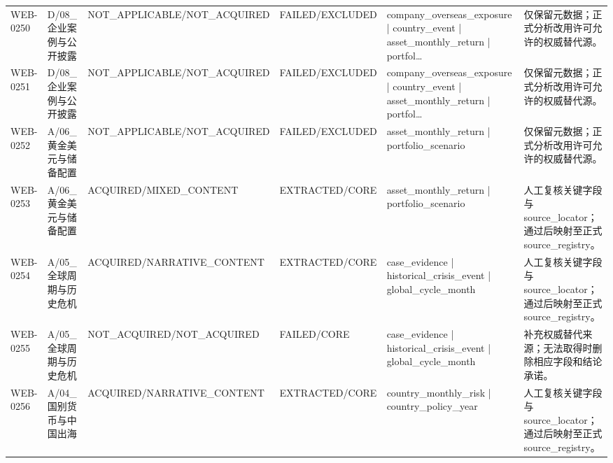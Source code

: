 \begin{landscape}
\begin{longtable}{p{1.8cm}p{2.6cm}p{2.6cm}p{2.6cm}p{4.8cm}p{7.2cm}}
WEB-0250 & D/\allowbreak{}08\_\allowbreak{}企业案例与公开披露 & NOT\_\allowbreak{}APPLICABLE/\allowbreak{}NOT\_\allowbreak{}ACQUIRED & FAILED/\allowbreak{}EXCLUDED & company\_\allowbreak{}overseas\_\allowbreak{}exposure | country\_\allowbreak{}event | asset\_\allowbreak{}monthly\_\allowbreak{}return | portfol… & 仅保留元数据；正式分析改用许可允许的权威替代源。\\
WEB-0251 & D/\allowbreak{}08\_\allowbreak{}企业案例与公开披露 & NOT\_\allowbreak{}APPLICABLE/\allowbreak{}NOT\_\allowbreak{}ACQUIRED & FAILED/\allowbreak{}EXCLUDED & company\_\allowbreak{}overseas\_\allowbreak{}exposure | country\_\allowbreak{}event | asset\_\allowbreak{}monthly\_\allowbreak{}return | portfol… & 仅保留元数据；正式分析改用许可允许的权威替代源。\\
WEB-0252 & A/\allowbreak{}06\_\allowbreak{}黄金美元与储备配置 & NOT\_\allowbreak{}APPLICABLE/\allowbreak{}NOT\_\allowbreak{}ACQUIRED & FAILED/\allowbreak{}EXCLUDED & asset\_\allowbreak{}monthly\_\allowbreak{}return | portfolio\_\allowbreak{}scenario & 仅保留元数据；正式分析改用许可允许的权威替代源。\\
WEB-0253 & A/\allowbreak{}06\_\allowbreak{}黄金美元与储备配置 & ACQUIRED/\allowbreak{}MIXED\_\allowbreak{}CONTENT & EXTRACTED/\allowbreak{}CORE & asset\_\allowbreak{}monthly\_\allowbreak{}return | portfolio\_\allowbreak{}scenario & 人工复核关键字段与source\_\allowbreak{}locator；通过后映射至正式source\_\allowbreak{}registry。\\
WEB-0254 & A/\allowbreak{}05\_\allowbreak{}全球周期与历史危机 & ACQUIRED/\allowbreak{}NARRATIVE\_\allowbreak{}CONTENT & EXTRACTED/\allowbreak{}CORE & case\_\allowbreak{}evidence | historical\_\allowbreak{}crisis\_\allowbreak{}event | global\_\allowbreak{}cycle\_\allowbreak{}month & 人工复核关键字段与source\_\allowbreak{}locator；通过后映射至正式source\_\allowbreak{}registry。\\
WEB-0255 & A/\allowbreak{}05\_\allowbreak{}全球周期与历史危机 & NOT\_\allowbreak{}ACQUIRED/\allowbreak{}NOT\_\allowbreak{}ACQUIRED & FAILED/\allowbreak{}CORE & case\_\allowbreak{}evidence | historical\_\allowbreak{}crisis\_\allowbreak{}event | global\_\allowbreak{}cycle\_\allowbreak{}month & 补充权威替代来源；无法取得时删除相应字段和结论承诺。\\
WEB-0256 & A/\allowbreak{}04\_\allowbreak{}国别货币与中国出海 & ACQUIRED/\allowbreak{}NARRATIVE\_\allowbreak{}CONTENT & EXTRACTED/\allowbreak{}CORE & country\_\allowbreak{}monthly\_\allowbreak{}risk | country\_\allowbreak{}policy\_\allowbreak{}year & 人工复核关键字段与source\_\allowbreak{}locator；通过后映射至正式source\_\allowbreak{}registry。\\

\end{longtable}
\end{landscape}
